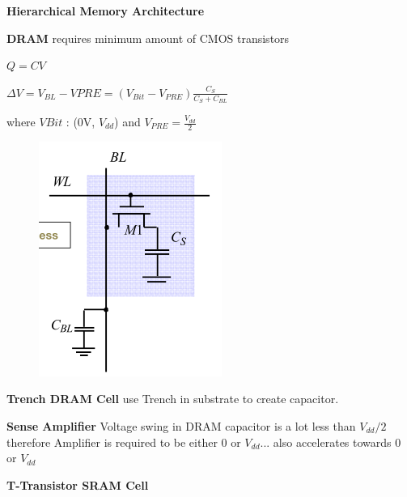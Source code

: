 \documentclass[english]{latex4ei/latex4ei_sheet}
\begin{document}
\textbf{Hierarchical Memory Architecture}

\textbf{DRAM} requires minimum amount of CMOS transistors

$Q = C V$

$\Delta V = V_{BL} - V{PRE} = (V_{Bit} - V_{PRE})\frac{C_S}{C_S + C_{BL}}$

where $V{Bit}$ : (0V, $V_{dd}$) and $V_{PRE} = \frac{V_{dd}}{2}$

\begin{figure}
	\centering
	\includegraphics[width=1\linewidth]{images//5.Memory/DRAMCell.png}
\end{figure}

\textbf{Trench DRAM Cell} use Trench in substrate to create capacitor.

\textbf{Sense Amplifier} Voltage swing in DRAM capacitor is a lot less than $V_{dd} / 2$ therefore Amplifier is required to be either 0 or $V_{dd}$... also accelerates towards 0 or $V_{dd}$

\textbf{T-Transistor SRAM Cell}
\end{document}
